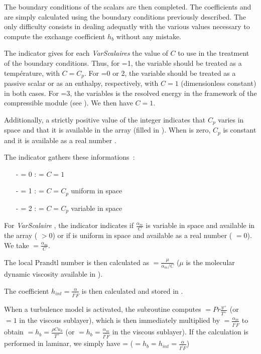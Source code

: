 The boundary conditions of the scalars are then completed. The coefficients
 and  are simply calculated using the boundary 
conditions previously described. The only difficulty consists in dealing
adequatly with the various values necessary to compute the exchange 
coefficient $h_b$ without any mistake.


The indicator  gives for each {\it VarScalaires} the value 
of  $C$ to use in the treatment of the boundary conditions. 
Thus, for =1,
the variable should be treated as a temp\'erature, with $C=C_p$. For
=0 or 2, the variable should be treated as a passive scalar 
or as an enthalpy, respectively, with  $C=1$ (dimensionless constant) 
in both cases. For =3, the variables is the resolved energy
in the framework of the compressible module  (see ). We then 
have $C=1$.

Additionally, a strictly positive value of the integer 
indicates that $C_p$ varies in space and that it is available in the
array  (filled in ). When 
is zero, $C_p$ is constant and it is available 
as a real number .


The indicator  gathers these informations~:
\begin{itemize}
\item [-]  = 0 :  = $C=1$
\item [-]  = 1 :  = $C=C_p$ uniform in space
\item [-]  = 2 :  = $C=C_p$ variable in space
\end{itemize}

For {\it VarScalaire} , the indicator 
indicates if $\displaystyle\frac{\alpha_m}{C}$
is variable in space and available in 
the array 
( $> 0$) or if is uniform in space and available 
as a real number 
 ( $= 0$). We take $ =
\displaystyle\frac{\alpha_m}{C}$.

The local Prandtl number is then calculated as  $ =
\displaystyle\frac{\mu}{\alpha_m/C}$ ($\mu$ is the molecular dynamic viscosity 
available in ).

The coefficient $h_{int}=\displaystyle\frac{\alpha}{\overline{I'F}}$  is
then calculated and stored in .

When a turbulence model is activated,
the subroutine  computes  $ =
Pr\displaystyle\frac{y^+}{T^+}$ (or ~$ = 1$ 
in the viscous sublayer),
which is then immediately multiplied by $ =
\displaystyle\frac{\alpha_m}{\overline{I'F}}$ to obtain  $ = h_b =
\displaystyle\frac{\rho C u_k}{T^+}$ (or  $ = h_b = \displaystyle\frac{\alpha_m}{\overline{I'F}}$ in the viscous sublayer).  
If the calculation is performed in laminar, we simply have
  =  ($ = h_b = h_{int}=\displaystyle\frac{\alpha}{\overline{I'F}}$)

